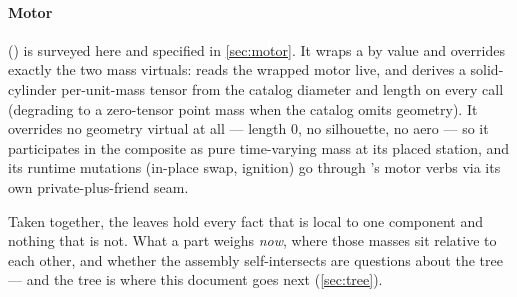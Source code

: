 \paragraph{Motor} () is surveyed here and specified in
\cref{sec:motor}. It wraps a  by value and overrides exactly the two mass
virtuals:  reads the wrapped motor live, and  derives a solid-cylinder
per-unit-mass tensor from the catalog diameter and length on every call (degrading to a
zero-tensor point mass when the catalog omits geometry). It overrides no geometry virtual at all
--- length 0, no silhouette, no aero --- so it participates in the composite as pure time-varying
mass at its placed station, and its runtime mutations (in-place swap, ignition) go through
's motor verbs via its own private-plus-friend seam.

Taken together, the leaves hold every fact that is local to one component and nothing that is not.
What a part weighs \emph{now}, where those masses sit relative to each other, and whether the
assembly self-intersects are questions about the tree --- and the tree is where this document goes
next (\cref{sec:tree}).
